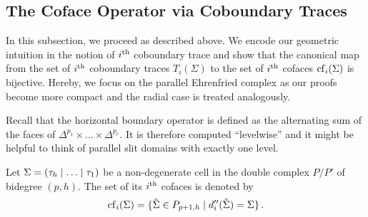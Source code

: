 \subsection{The Coface Operator via Coboundary Traces}
In this subsection, we proceed as described above.
We encode our geometric intuition in the notion of $i^{\text{th}}$ coboundary trace and show
that the canonical map from the set of $i^{\text{th}}$ coboundary traces $T_i(\Sigma)$ to the set of $i^{\text{th}}$ cofaces $\operatorname{cf}_i(\Sigma)$ is bijective.
Hereby, we focus on the parallel Ehrenfried complex as our proofs become more compact and the radial case is treated analogously.

Recall that the horizontal boundary operator is defined as the alternating sum of the faces of $\Delta^{p_1} \times \ldots \times \Delta^{p_r}$.
It is therefore computed ``levelwise'' and it might be helpful to think of parallel slit domains with exactly one level.

\begin{defi}
    \label{cellular_models:dual_ehrenfried:cofaces}
    Let $\Sigma = \inhom$ be a non-degenerate cell in the double complex $P/P'$ of bidegree $(p,h)$.
    The set of its $i^{\text{th}}$ cofaces is denoted by
    \[
        \operatorname{cf}_i(\Sigma) = \{ \tilde\Sigma \in P_{p+1, h} \mid d_i''(\tilde\Sigma) = \Sigma \} \,.
    \]
\end{defi}

